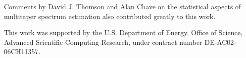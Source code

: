 
Comments by David J. Thomson and Alan Chave on the statistical aspects of
multitaper spectrum estimation also contributed greatly to this work. 

This work was supported by the U.S. Department of Energy, Office of Science, Advanced
Scientific Computing Research, under contract number DE-AC02-06CH11357.


